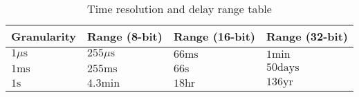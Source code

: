 \begin{table}[H]
\caption{Time resolution and delay range table}
\label{table:time-reso}
\begin{center}
    \begin{tabular} {| m{3cm} | m{3cm} | m{3cm} | m{3cm} | }
        \hline
        Granularity & Range (8-bit) & Range (16-bit) & Range (32-bit)\\
        \hline
        $1\mu \textrm{s}$ & $255\mu \textrm{s}$ & $66\textrm{ms}$ & $1\textrm{min}$\\
        $1\textrm{ms}$ & $255\textrm{ms}$ & $66\textrm{s}$ & $50\textrm{days}$\\
        $1\textrm{s}$ & $4.3\textrm{min}$ & $18\textrm{hr}$ & $136\textrm{yr}$\\
        \hline
    \end{tabular}
\end{center}
\end{table}
